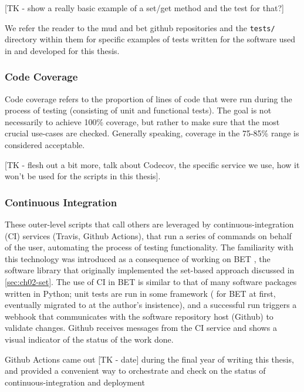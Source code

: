 [TK - show a really basic example of a set/get method and the test for that?]

We refer the reader to the mud and bet github repositories and the {\tt tests/} directory within them for specific examples of tests written for the software used in and developed for this thesis.

\subsubsection{Code Coverage}\label{sec:code-coverage}

Code coverage refers to the proportion of lines of code that were run during the process of testing (consisting of unit and functional tests).
The goal is not necessarily to achieve 100\% coverage, but rather to make sure that the most crucial use-cases are checked.
Generally speaking, coverage in the 75-85\% range is considered acceptable.

[TK - flesh out a bit more, talk about Codecov, the specific service we use, how it won't be used for the scripts in this thesis].


\subsubsection{Continuous Integration}\label{sec:continuous-integration}

These outer-level scripts that call others are leveraged by continuous-integration (CI) services (Travis, Github Actions), that run a series of commands on behalf of the user, automating the process of testing functionality.
The familiarity with this technology was introduced as a consequence of working on BET \cite{pyBET}, the software library that originally implemented the set-based approach discussed in \ref{sec:ch02-set}.
The use of CI in BET is similar to that of many software packages written in Python; unit tests are run in some framework ( for BET at first, eventually migrated to  at the author's insistence), and a successful run triggers a webhook that communicates with the software repository host (Github) to validate changes. Github receives messages from the CI service and shows a visual indicator of the status of the work done.

Github Actions came out [TK - date] during the final year of writing this thesis, and provided a convenient way to orchestrate and check on the status of continuous-integration and deployment

